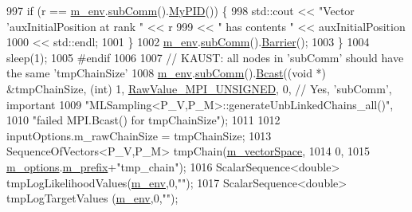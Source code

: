 \begin{DoxyCode}
997       \textcolor{keywordflow}{if} (r == \hyperlink{class_q_u_e_s_o_1_1_m_l_sampling_a13f1ca4fe9f94822fe572a743eaced1d}{m\_env}.\hyperlink{class_q_u_e_s_o_1_1_base_environment_affe39f53e3d5d678842413370af09145}{subComm}().\hyperlink{class_q_u_e_s_o_1_1_mpi_comm_ab806f80f206210723fcb4df8185a55a8}{MyPID}()) \{
998   std::cout << \textcolor{stringliteral}{"Vector 'auxInitialPosition at rank "} << r
999                   << \textcolor{stringliteral}{" has contents "}                      << auxInitialPosition
1000                   << std::endl;
1001       \}
1002       \hyperlink{class_q_u_e_s_o_1_1_m_l_sampling_a13f1ca4fe9f94822fe572a743eaced1d}{m\_env}.\hyperlink{class_q_u_e_s_o_1_1_base_environment_affe39f53e3d5d678842413370af09145}{subComm}().\hyperlink{class_q_u_e_s_o_1_1_mpi_comm_a4059971c30e023b272fccaa6aa00c426}{Barrier}();
1003     \}
1004     sleep(1);
1005 \textcolor{preprocessor}{#endif}
1006 \textcolor{preprocessor}{}
1007     \textcolor{comment}{// KAUST: all nodes in 'subComm' should have the same 'tmpChainSize'}
1008     \hyperlink{class_q_u_e_s_o_1_1_m_l_sampling_a13f1ca4fe9f94822fe572a743eaced1d}{m\_env}.\hyperlink{class_q_u_e_s_o_1_1_base_environment_affe39f53e3d5d678842413370af09145}{subComm}().\hyperlink{class_q_u_e_s_o_1_1_mpi_comm_abd6af8db8b0c7fd2f5b62e26477a9537}{Bcast}((\textcolor{keywordtype}{void} *) &tmpChainSize, (\textcolor{keywordtype}{int}) 1, 
      \hyperlink{_mpi_comm_8h_a06cbfbc33436f6e0dc8a48ff3c49bdfc}{RawValue\_MPI\_UNSIGNED}, 0, \textcolor{comment}{// Yes, 'subComm', important}
1009                           \textcolor{stringliteral}{"MLSampling<P\_V,P\_M>::generateUnbLinkedChains\_all()"},
1010                           \textcolor{stringliteral}{"failed MPI.Bcast() for tmpChainSize"});
1011 
1012     inputOptions.m\_rawChainSize = tmpChainSize;
1013     SequenceOfVectors<P\_V,P\_M> tmpChain(\hyperlink{class_q_u_e_s_o_1_1_m_l_sampling_a7bc4c72f65ba9166ed94a6e198b0915b}{m\_vectorSpace},
1014                                                0,
1015                                                \hyperlink{class_q_u_e_s_o_1_1_m_l_sampling_af8504cc57ec72b3c52833826b2bfff8e}{m\_options}.\hyperlink{class_q_u_e_s_o_1_1_m_l_sampling_options_a1d3d48598e0b59b46337ce66a52671a5}{m\_prefix}+\textcolor{stringliteral}{"tmp\_chain"});
1016     ScalarSequence<double> tmpLogLikelihoodValues(\hyperlink{class_q_u_e_s_o_1_1_m_l_sampling_a13f1ca4fe9f94822fe572a743eaced1d}{m\_env},0,\textcolor{stringliteral}{""});
1017     ScalarSequence<double> tmpLogTargetValues    (\hyperlink{class_q_u_e_s_o_1_1_m_l_sampling_a13f1ca4fe9f94822fe572a743eaced1d}{m\_env},0,\textcolor{stringliteral}{""});

\end{DoxyCode}
